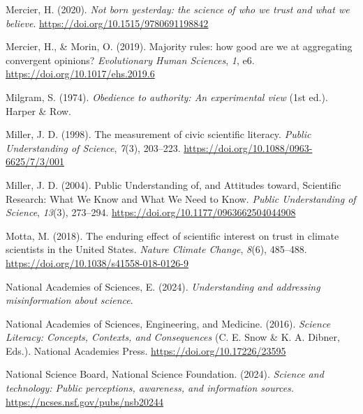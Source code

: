\documentclass[
  jou,
  floatsintext,
  longtable,
  nolmodern,
  notxfonts,
  notimes,
  colorlinks=true,linkcolor=blue,citecolor=blue,urlcolor=blue]{apa7}
\newlength{\cslhangindent}
\newenvironment{CSLReferences}[2] %
 {\begin{list}{}{%
  \setlength{\itemindent}{0pt}
  \setlength{\leftmargin}{0pt}
  \setlength{\parsep}{0pt}
  \ifodd #1
   \setlength{\leftmargin}{\cslhangindent}
   \setlength{\itemindent}{-1\cslhangindent}
  \fi
  \setlength{\itemsep}{#2\baselineskip}}}
 {\end{list}}
\begin{document}
\begin{CSLReferences}{1}{0}
Mercier, H. (2020). \emph{Not born yesterday: the science of who we
trust and what we believe}. \url{https://doi.org/10.1515/9780691198842}

Mercier, H., \& Morin, O. (2019). Majority rules: how good are we at
aggregating convergent opinions? \emph{Evolutionary Human Sciences},
\emph{1}, e6. \url{https://doi.org/10.1017/ehs.2019.6}

Milgram, S. (1974). \emph{Obedience to authority: An experimental view}
(1st ed.). Harper \& Row.

Miller, J. D. (1998). The measurement of civic scientific literacy.
\emph{Public Understanding of Science}, \emph{7}(3), 203--223.
\url{https://doi.org/10.1088/0963-6625/7/3/001}

Miller, J. D. (2004). Public Understanding of, and Attitudes toward,
Scientific Research: What We Know and What We Need to Know. \emph{Public
Understanding of Science}, \emph{13}(3), 273--294.
\url{https://doi.org/10.1177/0963662504044908}

Motta, M. (2018). The enduring effect of scientific interest on trust in
climate scientists in the United States. \emph{Nature Climate Change},
\emph{8}(6), 485--488. \url{https://doi.org/10.1038/s41558-018-0126-9}

National Academies of Sciences, E. (2024). \emph{Understanding and
addressing misinformation about science}.

National Academies of Sciences, Engineering, and Medicine. (2016).
\emph{Science Literacy: Concepts, Contexts, and Consequences} (C. E.
Snow \& K. A. Dibner, Eds.). National Academies Press.
\url{https://doi.org/10.17226/23595}

National Science Board, National Science Foundation. (2024).
\emph{Science and technology: Public perceptions, awareness, and
information sources.} \url{https://ncses.nsf.gov/pubs/nsb20244}


\end{CSLReferences}
\end{document}

